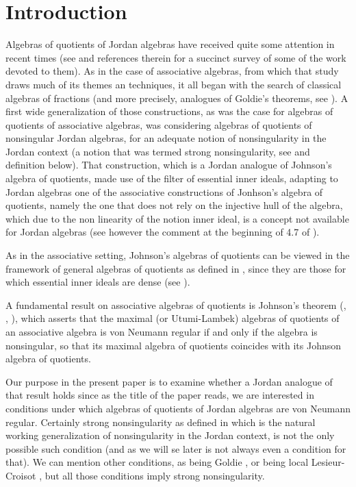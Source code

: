 \documentclass[a4paper,twoside,11pt]{article}
\theoremstyle{plain}
\theoremstyle{miestilo}
\theoremstyle{misnotas}
\begin{document}
\section*{Introduction} Algebras of quotients of Jordan algebras have received quite some attention in recent times (see \cite{densos, localorders} and references therein for a succinct survey of some of the work devoted to them). As in the case of associative algebras, from which that study draws much of its themes an techniques, it all began with the search of classical algebras of fractions (and more precisely, analogues of Goldie's theorems, see \cite{z-goldie-1, z-goldie-2}). A first wide generalization of those constructions, as was the case for algebras of quotients of associative algebras, was considering algebras of quotients of nonsingular Jordan algebras, for an adequate notion of nonsingularity in the Jordan context (a notion that was termed strong nonsingularity,  see \cite{esenciales} and definition below). That construction, which is a Jordan analogue of Johnson's algebra of quotients, made use of the filter of essential inner ideals, adapting to Jordan algebras one of the associative constructions of Jonhson's algebra of quotients, namely the one that does not rely on the injective hull of the algebra, which due to the non linearity of the notion inner ideal, is a concept not available for Jordan algebras (see however the comment at the beginning of 4.7 of \cite{pi-ii}).

As in the associative setting, Johnson's algebras of quotients can be viewed in the framework of general algebras of quotients as defined in \cite{densos}, since they are those for which essential inner ideals are dense (see \cite[5.19] {densos}).

A  fundamental result on associative algebras of quotients is Johnson's theorem (\cite[13.36]{Lam}, \cite[Theorem 26.11]{passman}, \cite[Theorem 26.11]{bmami}), which asserts that the maximal (or Utumi-Lambek) algebras of quotients of an associative algebra is von Neumann regular if and only if the algebra is nonsingular, so that its maximal algebra of quotients coincides with its Johnson algebra of quotients.

 Our purpose in the present paper is to examine whether a Jordan analogue of that result holds since as the title of the paper reads,  we are interested in conditions under which algebras of quotients of Jordan algebras are von Neumann regular. Certainly strong nonsingularity as defined in \cite{esenciales} which is the natural working  generalization of nonsingularity in the Jordan context, is not the only possible such condition (and as we will se later is not always even a condition for that). We can mention other conditions, as being Goldie \cite{fgm}, or being local Lesieur-Croisot \cite[Theorem 5.5]{localorders}, but all those conditions imply strong nonsingularity.
\end{document}
